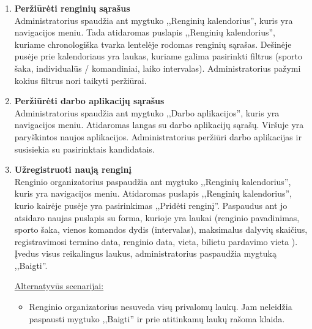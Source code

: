 \documentclass{VUMIFPSkursinis}
\begin{document}
\begin{enumerate} [label = \textbf{U\arabic*.}]
					\underline{Alternatyvūs scenarijai:}
					\begin{itemize}
						\item Administratorius bando atlikti vieną iš šių veiksmų kito administratoriaus paskyrai. Tokiu atveju mygtukai yra neaktyvūs ir virš jų atsiranda užrašas, kad administratoriai negali redaguoti kitų administratorių prieigos.
						\item Jei vartotojui jau apribota arba blokuojama prieiga, prie atitinkamų mygtukų rodoma trukmė, ir paspaudus ,,Apriboti prieiga'' arba ,,Blokuoti prieigą'' mygtukus laukas užpildomas esama apribojimu trukme.						
					\end{itemize}
				
			\item \textbf{Peržiūrėti renginių sąrašus}   \\
					Administratorius spaudžia ant mygtuko ,,Renginių kalendorius'', kuris yra navigacijos meniu. Tada atidaromas puslapis ,,Renginių kalendorius'', kuriame chronologiška tvarka lentelėje rodomas renginių sąrašas. Dešinėje pusėje prie kalendoriaus yra laukas, kuriame galima pasirinkti filtrus (sporto šaka, individualūs / komandiniai, laiko intervalas). Administratorius pažymi kokius filtrus nori taikyti peržiūrai.
				
			\item \textbf{Peržiūrėti darbo aplikacijų sąrašus}   \\
					Administratorius spaudžia ant mygtuko ,,Darbo aplikacijos'', kuris yra navigacijos meniu. Atidaromas langas su darbo aplikacijų sąrašų. Viršuje yra paryškintos naujos aplikacijos. Administratorius peržiūri darbo aplikacijas ir susisiekia su pasirinktais kandidatais.

			\item \textbf{Užregistruoti naują renginį}   \\
					Renginio organizatorius paspaudžia ant mygtuko ,,Renginių kalendorius'', kuris yra navigacijos meniu. Atidaromas puslapis ,,Renginių kalendorius'', kurio kairėje pusėje yra pasirinkimas ,,Pridėti renginį''. Paspaudus ant jo atsidaro naujas puslapis su forma, kurioje yra laukai (renginio pavadinimas, sporto šaka, vienos komandos dydis (intervalas), maksimalus dalyvių skaičius, registravimosi termino data, renginio data, vieta, bilietu pardavimo vieta ). Įvedus visus reikalingus laukus, administratorius paspaudžia mygtuką ,,Baigti''.
					
					\underline{Alternatyvūs scenarijai:}
					\begin{itemize}
						\item Renginio organizatorius nesuveda visų privalomų laukų. Jam neleidžia paspausti mygtuko ,,Baigti'' ir prie atitinkamų laukų rašoma klaida.
					\end{itemize}	
			

\end{enumerate}
\end{document}
